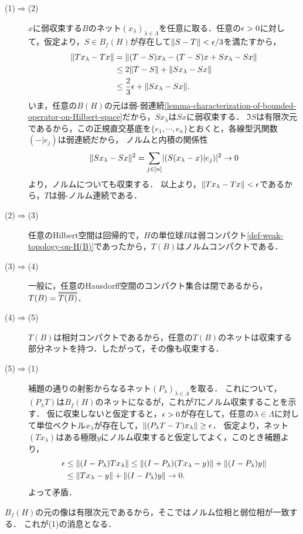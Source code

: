 \documentclass[uplatex,dvipdfmx]{jsreport}
\begin{document}
\begin{Proof}\mbox{}
    \begin{description}
        \item[(1)$\Rightarrow$(2)] 
        $x$に弱収束する$B$のネット$(x_\lambda)_{\lambda\in\Lambda}$を任意に取る．任意の$\epsilon>0$に対して，仮定より，$S\in B_f(H)$が存在して$\|S-T\|<\epsilon/3$を満たすから，
        \begin{align*}
            \|Tx_\lambda-Tx\|&=\|(T-S)x_\lambda-(T-S)x+Sx_\lambda-Sx\|\\
            &\le2\|T-S\|+\|Sx_\lambda-Sx\|\\
            &\le\frac{2}{3}\epsilon+\|Sx_\lambda-Sx\|.
        \end{align*}
        いま，任意の$B(H)$の元は弱-弱連続\ref{lemma-characterization-of-bounded-operator-on-Hilbert-space}だから，$Sx_\lambda$は$Sx$に弱収束する．
        $\Im S$は有限次元であるから，この正規直交基底を$\{e_1,\cdots,e_n\}$とおくと，各線型汎関数$(-|e_j)$は弱連続だから，
        ノルムと内積の関係性
        \[\|Sx_\lambda-Sx\|^2=\sum_{j\in[n]}\lvert(S(x_\lambda-x)|e_j)\rvert^2\to0\]
        より，ノルムについても収束する．
        以上より，$\|Tx_\lambda-Tx\|<\epsilon$であるから，$T$は弱-ノルム連続である．
        \item[(2)$\Rightarrow$(3)]
        任意のHilbert空間は回帰的で，$H$の単位球$B$は弱コンパクト\ref{def-weak-topology-on-H(B)}であったから，$T(B)$はノルムコンパクトである．
        \item[(3)$\Rightarrow$(4)]
        一般に，任意のHausdorff空間のコンパクト集合は閉であるから，$T(B)=\oo{T(B)}$．
        \item[(4)$\Rightarrow$(5)]
        $T(B)$は相対コンパクトであるから，任意の$T(B)$のネットは収束する部分ネットを持つ．したがって，その像も収束する．
        \item[(5)$\Rightarrow$(1)]
        補題の通りの射影からなるネット$(P_\lambda)_{\lambda\in\Lambda}$を取る．
        これについて，$(P_\lambda T)$は$B_f(H)$のネットになるが，これが$T$にノルム収束することを示す．
        仮に収束しないと仮定すると，$\epsilon>0$が存在して，任意の$\lambda\in\Lambda$に対して単位ベクトル$x_\lambda$が存在して，$\|(P_\lambda T-T)x_\lambda\|\ge\epsilon$．
        仮定より，ネット$(Tx_\lambda)$はある極限$y$にノルム収束すると仮定してよく，このとき補題より，
        \begin{align*}
            \epsilon&\le\|(I-P_\lambda)Tx_\lambda\|\le\|(I-P_\lambda)(Tx_\lambda-y)\|+\|(I-P_\lambda)y\|\\
            &\le\|Tx_\lambda-y\|+\|(I-P_\lambda)y\|\to0.
        \end{align*}
        よって矛盾．
    \end{description}
\end{Proof}
\begin{remarks}
    $B_f(H)$の元の像は有限次元であるから，そこではノルム位相と弱位相が一致する．
    これが(1)の消息となる．
\end{remarks}
\end{document}
